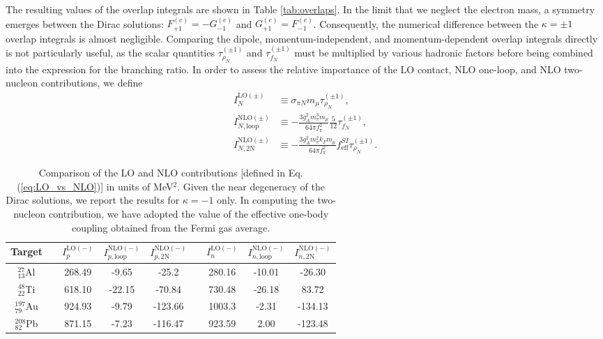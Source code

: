 \documentclass{book}[letterpaper,12pt]
\begin{document}
The resulting values of the overlap integrals are shown in Table \ref{tab:overlaps}. In the limit that we neglect the electron mass, a symmetry emerges between the Dirac solutions: $F_{+1}^{(e)}=-G_{-1}^{(e)}$ and $G_{+1}^{(e)}=F_{-1}^{(e)}$. Consequently, the numerical difference between the $\kappa=\pm 1$ overlap integrals is almost negligible. Comparing the dipole, momentum-independent, and momentum-dependent overlap integrals directly is not particularly useful, as the scalar quantities $\tau^{(\pm 1)}_{\rho_N}$ and $\tau^{(\pm 1)}_{f_N}$ must be multiplied by various hadronic factors before being combined into the expression for the branching ratio. In order to assess the relative importance of the LO contact, NLO one-loop, and NLO two-nucleon contributions, we define
\begin{equation}
\begin{split}
I_{N}^{\mathrm{LO}(\pm)}&\equiv \sigma_{\pi N}m_{\mu}\tau^{(\pm 1)}_{\rho_N},\\
I_{N,\mathrm{loop}}^{\mathrm{NLO}(\pm)}&\equiv -\frac{3g_A^2m_{\pi}^3m_{\mu}}{64\pi f_{\pi}^2}\frac{5}{12}\tau^{(\pm 1)}_{f_N},\\
I^{\mathrm{NLO}(\pm)}_{N,\mathrm{2N}}&\equiv -\frac{3g_A^2m_{\pi}^2k_Fm_{\mu}}{64\pi f_{\pi}^2}f^{SI}_\mathrm{eff}\tau^{(\pm 1)}_{\rho_N}.
\end{split}
\label{eq:LO_vs_NLO}
\end{equation}
\begin{table}
\centering
{\renewcommand{\arraystretch}{1.5}
\begin{tabular}{ccccccccc}
\hline
\hline
Target & & $I_{p}^{\mathrm{LO}(-)}$ & $I_{p,\mathrm{loop}}^{\mathrm{NLO}(-)}$ & $I^{\mathrm{NLO}(-)}_{p,\mathrm{2N}}$ & & $I_{n}^{\mathrm{LO}(-)}$ &  $I_{n,\mathrm{loop}}^{\mathrm{NLO}(-)}$ & $I^{\mathrm{NLO}(-)}_{n,\mathrm{2N}}$\\
\hline
$^{27}_{13}$Al & & 268.49 & -9.65 & -25.2 & & 280.16 & -10.01 & -26.30\\
$^{48}_{22}$Ti & & 618.10 & -22.15 & -70.84 & & 730.48 & -26.18 & 83.72\\
$^{197}_{79}$Au & & 924.93 & -9.79 & -123.66 & & 1003.3 & -2.31 & -134.13 \\
$^{208}_{82}$Pb & & 871.15 & -7.23 & -116.47 & & 923.59 & 2.00 & -123.48\\ 
\hline
\hline
\end{tabular}
}
\caption{Comparison of the LO and NLO contributions [defined in Eq. (\ref{eq:LO_vs_NLO})] in units of MeV$^2$. Given the near degeneracy of the Dirac solutions, we report the results for $\kappa=-1$ only. In computing the two-nucleon contribution, we have adopted the value of the effective one-body coupling obtained from the Fermi gas average.}
\label{tab:LO_vs_NLO}
\end{table}
\end{document}
